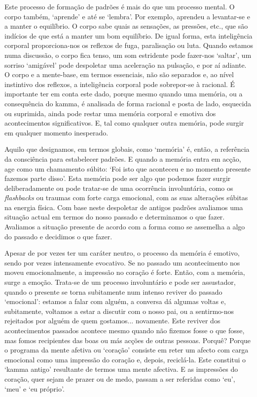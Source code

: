 Este processo de formação de padrões é mais do que um processo mental. O corpo também, `aprende' e até se `lembra'. Por exemplo, aprendeu a levantar-se e a manter o equilíbrio. O corpo sabe quais as sensações, as pressões, etc., que são indícios de que está a manter um bom equilíbrio. De igual forma, esta inteligência corporal proporciona-nos os reflexos de fuga, paralisação ou luta. Quando estamos numa discussão, o corpo fica tenso, um som estridente pode fazer-nos `saltar', um sorriso `amigável' pode despoletar uma aceleração na pulsação, e por aí adiante. O corpo e a mente-base, em termos essenciais, não são separados e, ao nível instintivo dos reflexos, a inteligência corporal pode sobrepor-se à racional. É importante ter em conta este dado, porque mesmo quando uma memória, ou a consequência do kamma, é analisada de forma racional e posta de lado, esquecida ou suprimida, ainda pode restar uma memória corporal e emotiva dos acontecimentos significativos. E, tal como qualquer outra memória, pode surgir em qualquer momento inesperado.

Aquilo que designamos, em termos globais, como `memória' é, então, a referência da consciência para estabelecer padrões. E quando a memória entra em acção, age como um chamamento súbito: `Foi isto que aconteceu e no momento presente fazemos parte disso'. Esta memória pode ser algo que podemos fazer surgir deliberadamente ou pode tratar-se de uma ocorrência involuntária, como os \emph{flashbacks} ou traumas com forte carga emocional, com as suas alterações súbitas na energia física. Com base neste despoletar de antigos padrões avaliamos uma situação actual em termos do nosso passado e determinamos o que fazer. Avaliamos a situação presente de acordo com a forma como se assemelha a algo do passado e decidimos o que fazer.

Apesar de por vezes ter um caráter neutro, o processo da memória é emotivo, sendo por vezes intensamente evocativo. Se no passado um acontecimento nos moveu emocionalmente, a impressão no coração é forte. Então, com a memória, surge a emoção. Trata-se de um processo involuntário e pode ser assustador, quando o presente se torna subitamente num intenso reviver do passado `emocional': estamos a falar com alguém, a conversa dá algumas voltas e, subitamente, voltamos a estar a discutir com o nosso pai, ou a sentirmo-nos rejeitados por alguém de quem gostamos... novamente. Este reviver dos acontecimentos passados acontece mesmo quando não fizemos fosse o que fosse, mas fomos recipientes das boas ou más acções de outras pessoas. Porquê? Porque o programa da mente afetiva ou `coração' consiste em reter um afecto com carga emocional como uma impressão do coração e, depois, reciclá-la. Este constitui o `kamma antigo' resultante de termos uma mente afectiva. E as impressões do coração, quer sejam de prazer ou de medo, passam a ser referidas como `eu', `meu' e `eu próprio'.

